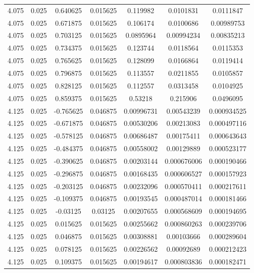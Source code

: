 \begin{table}[bh]
\begin{center}
{\begin{tabular}{ccccccc}
4.075	 & 0.025 & 	0.640625	 & 0.015625	 & 0.119982	 & 0.0101831	 & 0.0111847 \\ 
4.075	 & 0.025 & 	0.671875	 & 0.015625	 & 0.106174	 & 0.0100686	 & 0.00989753 \\ 
4.075	 & 0.025 & 	0.703125	 & 0.015625	 & 0.0895964	 & 0.00994234	 & 0.00835213 \\ 
4.075	 & 0.025 & 	0.734375	 & 0.015625	 & 0.123744	 & 0.0118564	 & 0.0115353 \\ 
4.075	 & 0.025 & 	0.765625	 & 0.015625	 & 0.128099	 & 0.0166864	 & 0.0119414 \\ 
4.075	 & 0.025 & 	0.796875	 & 0.015625	 & 0.113557	 & 0.0211855	 & 0.0105857 \\ 
4.075	 & 0.025 & 	0.828125	 & 0.015625	 & 0.112557	 & 0.0313458	 & 0.0104925 \\ 
4.075	 & 0.025 & 	0.859375	 & 0.015625	 & 0.53218	 & 0.215906	 & 0.0496095 \\ 
4.125	 & 0.025 & 	-0.765625	 & 0.046875	 & 0.00996731	 & 0.00543239	 & 0.000934525 \\ 
4.125	 & 0.025 & 	-0.671875	 & 0.046875	 & 0.00530206	 & 0.00213083	 & 0.000497116 \\ 
4.125	 & 0.025 & 	-0.578125	 & 0.046875	 & 0.00686487	 & 0.00175411	 & 0.000643643 \\ 
4.125	 & 0.025 & 	-0.484375	 & 0.046875	 & 0.00558002	 & 0.00129889	 & 0.000523177 \\ 
4.125	 & 0.025 & 	-0.390625	 & 0.046875	 & 0.00203144	 & 0.000676006	 & 0.000190466 \\ 
4.125	 & 0.025 & 	-0.296875	 & 0.046875	 & 0.00168435	 & 0.000606527	 & 0.000157923 \\ 
4.125	 & 0.025 & 	-0.203125	 & 0.046875	 & 0.00232096	 & 0.000570411	 & 0.000217611 \\ 
4.125	 & 0.025 & 	-0.109375	 & 0.046875	 & 0.00193545	 & 0.000487014	 & 0.000181466 \\ 
4.125	 & 0.025 & 	-0.03125	 & 0.03125	 & 0.00207655	 & 0.000568609	 & 0.000194695 \\ 
4.125	 & 0.025 & 	0.015625	 & 0.015625	 & 0.00255662	 & 0.000860263	 & 0.000239706 \\ 
4.125	 & 0.025 & 	0.046875	 & 0.015625	 & 0.00308881	 & 0.00103666	 & 0.000289604 \\ 
4.125	 & 0.025 & 	0.078125	 & 0.015625	 & 0.00226562	 & 0.00092689	 & 0.000212423 \\ 
4.125	 & 0.025 & 	0.109375	 & 0.015625	 & 0.00194617	 & 0.000803836	 & 0.000182471 \\ 

\end{tabular}}
\end{center}
\end{table}
